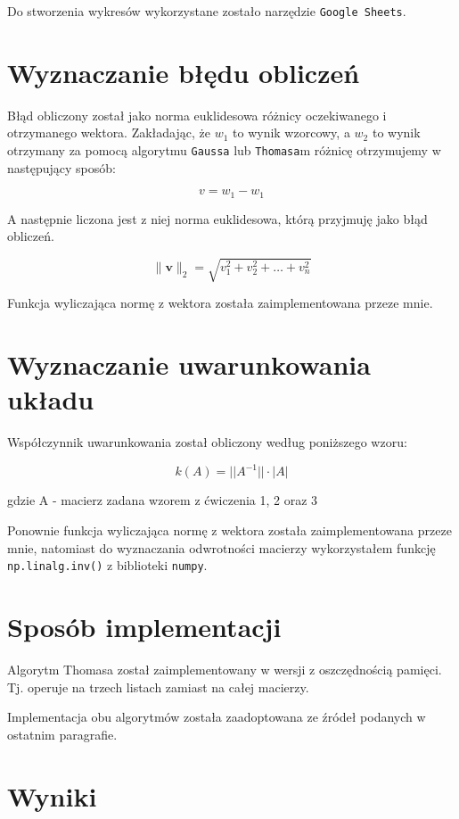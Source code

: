\documentclass{article}
\begin{document}
Do stworzenia wykresów wykorzystane zostało narzędzie \texttt{Google Sheets}.

\section{Wyznaczanie błędu obliczeń}

\noindent
Błąd obliczony został jako norma euklidesowa różnicy oczekiwanego i otrzymanego wektora.
Zakładając, że \(w_1\) to wynik wzorcowy, a \(w_2\) to wynik otrzymany za pomocą algorytmu \texttt{Gaussa} lub \texttt{Thomasa}m różnicę otrzymujemy w następujący sposób:

\[v = w_1 - w_1\]

\noindent
A następnie liczona jest z niej norma euklidesowa, którą przyjmuję jako błąd obliczeń.

\[\| \mathbf{v} \|_2 = \sqrt{v_1^2 + v_2^2 + \ldots + v_n^2}\]

\noindent
Funkcja wyliczająca normę z wektora została zaimplementowana przeze mnie.

\section{Wyznaczanie uwarunkowania układu}

Współczynnik uwarunkowania został obliczony według poniższego wzoru:

\[k(A) = ||A^{-1}|| \cdot |A|\]

\noindent
gdzie A - macierz zadana wzorem z ćwiczenia 1, 2 oraz 3

\bigbreak

\noindent
Ponownie funkcja wyliczająca normę z wektora została zaimplementowana przeze mnie, natomiast do wyznaczania odwrotności macierzy wykorzystałem funkcję \texttt{np.linalg.inv()} z biblioteki \texttt{numpy}.

\section{Sposób implementacji}

Algorytm Thomasa został zaimplementowany w wersji z oszczędnością pamięci. Tj. operuje na trzech listach zamiast na całej macierzy.

\bigbreak

\noindent
Implementacja obu algorytmów została zaadoptowana ze źródeł podanych w ostatnim paragrafie.

\section{Wyniki}
\end{document}
